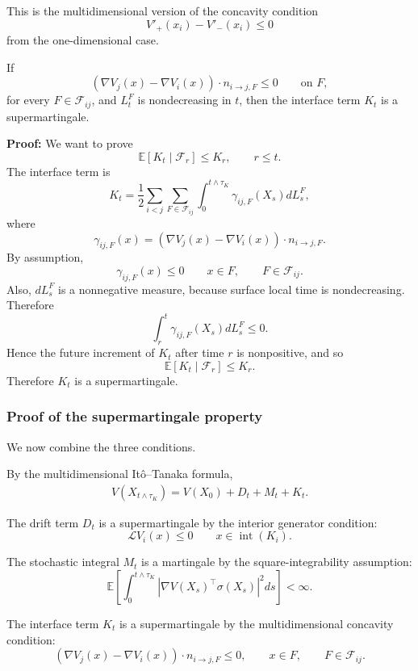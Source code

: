 \begin{enumerate}
This is the multidimensional version of the concavity condition
\[
    V'_+(x_i) - V'_-(x_i) \leq 0
\]
from the one-dimensional case.

\begin{fact}
If
\[
    \left(
        \nabla V_j(x) - \nabla V_i(x)
    \right)\cdot n_{i\to j,F}
    \leq 0
    \qquad \text{on } F,
\]
for every $F\in\mathcal F_{ij}$, and $L_t^F$ is nondecreasing in $t$, then the
interface term $K_t$ is
a supermartingale.

\textbf{Proof:} We want to prove
\[
    \mathbb{E}[K_t \mid \mathcal{F}_r] \leq K_r,
    \qquad r \leq t.
\]
The interface term is
\[
    K_t
    =
    \frac{1}{2}
    \sum_{i<j}
    \sum_{F\in\mathcal F_{ij}}
    \int_0^{t \wedge \tau_K}
    \gamma_{ij,F}(X_s)dL_s^F,
\]
where
\[
    \gamma_{ij,F}(x)
    =
    \left(
        \nabla V_j(x) - \nabla V_i(x)
    \right)\cdot n_{i\to j,F}.
\]
By assumption,
\[
    \gamma_{ij,F}(x) \leq 0
    \qquad x \in F,
    \qquad F\in\mathcal F_{ij}.
\]
Also, $dL_s^F$ is a nonnegative measure, because surface local time is
nondecreasing. Therefore
\[
    \int_r^t \gamma_{ij,F}(X_s)dL_s^F \leq 0.
\]
Hence the future increment of $K_t$ after time $r$ is nonpositive, and so
\[
    \mathbb{E}[K_t \mid \mathcal{F}_r] \leq K_r.
\]
Therefore $K_t$ is a supermartingale.
\end{fact}
\end{enumerate}

\subsubsection{Proof of the supermartingale property}

We now combine the three conditions.

By the multidimensional Itô--Tanaka formula,
\begin{align}
V(X_{t \wedge \tau_K})
=
V(X_0)
+
D_t
+
M_t
+
K_t.
\end{align}

The drift term $D_t$ is a supermartingale by the interior generator condition:
\[
\mathcal{L}V_i(x) \leq 0
\qquad x \in \operatorname{int}(K_i).
\]

The stochastic integral $M_t$ is a martingale by the square-integrability
assumption:
\[
\mathbb{E}\left[
\int_0^{t \wedge \tau_K}
\left|
\nabla V(X_s)^\top \sigma(X_s)
\right|^2 ds
\right]
< \infty.
\]

The interface term $K_t$ is a supermartingale by the multidimensional concavity
condition:
\[
\left(
\nabla V_j(x) - \nabla V_i(x)
\right)\cdot n_{i\to j,F}
\leq 0,
\qquad x \in F,
\qquad F\in\mathcal F_{ij}.
\]

